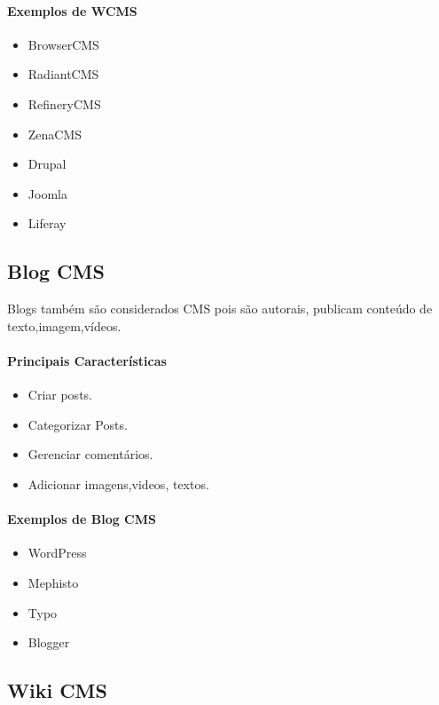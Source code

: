\paragraph{Exemplos de WCMS} 

\begin{itemize}
  \item BrowserCMS
  \item RadiantCMS
  \item RefineryCMS
  \item ZenaCMS
  \item Drupal
  \item Joomla
  \item Liferay
\end{itemize}  


\subsection{Blog CMS} 

Blogs também são considerados CMS pois são autorais, publicam conteúdo de texto,imagem,vídeos.

\paragraph{Principais Características}

\begin{itemize}
  \item Criar posts.
  \item Categorizar Posts.
  \item Gerenciar comentários.
  \item Adicionar imagens,videos, textos.
\end{itemize}

\paragraph{Exemplos de Blog CMS} 

\begin{itemize}
  \item WordPress
  \item Mephisto
  \item Typo
  \item Blogger
\end{itemize}

\subsection{Wiki CMS} 

